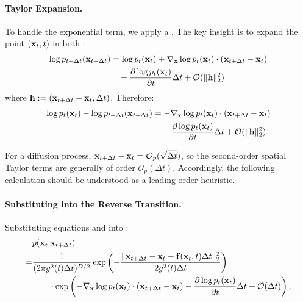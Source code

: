 \paragraph{Taylor Expansion.} 
To handle the exponential term, we apply a . The key insight is to expand  the point $({\mathbf{x}}_t, t)$ in both :
\begin{align*}
    \log p_{t+\Delta t}({\mathbf{x}}_{t+\Delta t}) &= \log p_t({\mathbf{x}}_t) + \nabla_{{\mathbf{x}}} \log p_t({\mathbf{x}}_t) \cdot ({\mathbf{x}}_{t+\Delta t} - {\mathbf{x}}_t) \nonumber \\
    &\quad + \frac{\partial \log p_t({\mathbf{x}}_t)}{\partial t} \Delta t + \mathcal{O}(\|{\mathbf{h}}\|_2^2) 
\end{align*}
where ${\mathbf{h}} := ({\mathbf{x}}_{t+\Delta t} - {\mathbf{x}}_t, \Delta t)$. Therefore:
\begin{align}
    \log p_t({\mathbf{x}}_t) - \log p_{t+\Delta t}({\mathbf{x}}_{t+\Delta t}) &= -\nabla_{{\mathbf{x}}} \log p_t({\mathbf{x}}_t) \cdot ({\mathbf{x}}_{t+\Delta t} - {\mathbf{x}}_t) \nonumber \\
    &\quad - \frac{\partial \log p_t({\mathbf{x}}_t)}{\partial t} \Delta t + \mathcal{O}(\|{\mathbf{h}}\|_2^2) \label{eq:log-difference}
\end{align}

For a diffusion process,
${\mathbf{x}}_{t+\Delta t}-{\mathbf{x}}_t=\mathcal O_p(\sqrt{\Delta t})$, so the
second-order spatial Taylor terms are generally of order
$\mathcal O_p(\Delta t)$. Accordingly, the following calculation should be
understood as a leading-order heuristic.

\paragraph{Substituting into the Reverse Transition.}
Substituting equations  and  into :
\begin{align*}
    &p({\mathbf{x}}_t | {\mathbf{x}}_{t+\Delta t}) \nonumber \\
    = &\frac{1}{(2\pi g^2(t) \Delta t)^{D/2}} \exp\left(-\frac{\|{\mathbf{x}}_{t+\Delta t} - {\mathbf{x}}_t - {\mathbf{f}}({\mathbf{x}}_t, t) \Delta t\|_2^2}{2 g^2(t) \Delta t}\right) \nonumber \\
    &\qquad \cdot \exp\left(-\nabla_{{\mathbf{x}}} \log p_t({\mathbf{x}}_t) \cdot ({\mathbf{x}}_{t+\Delta t} - {\mathbf{x}}_t) - \frac{\partial \log p_t({\mathbf{x}}_t)}{\partial t} \Delta t +\mathcal{O}(\Delta t)\right). 
\end{align*}
